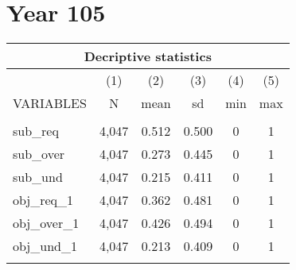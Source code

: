 \documentclass[]{article}
\begin{document}
\section*{Year 105}

\begin{tabular}{lccccc}
\multicolumn{6}{c}{Decriptive statistics} \\ \hline
 & (1) & (2) & (3) & (4) & (5) \\
VARIABLES & N & mean & sd & min & max \\ \hline
 &  &  &  &  &  \\
sub\_req & 4,047 & 0.512 & 0.500 & 0 & 1 \\
sub\_over & 4,047 & 0.273 & 0.445 & 0 & 1 \\
sub\_und & 4,047 & 0.215 & 0.411 & 0 & 1 \\
obj\_req\_1 & 4,047 & 0.362 & 0.481 & 0 & 1 \\
obj\_over\_1 & 4,047 & 0.426 & 0.494 & 0 & 1 \\
obj\_und\_1 & 4,047 & 0.213 & 0.409 & 0 & 1 \\
 &  &  &  &  &  \\ \hline
\end{tabular}
\end{document}
